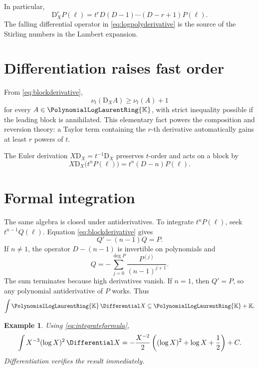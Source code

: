 \documentclass[11pt,oneside,openany]{book}
\newtheorem{example}[theorem]{Example}
\newcommand{\K}{\mathbb{K}}
\newcommand{\Pring}{\PolynomialLogLaurentRing{\K}}
\newcommand{\ordt}{\nu_t}
\newcommand{\D}{\mathrm{D}}
\begin{document}
In particular,
\begin{equation}\label{eq:logpolyderivative}
  \D_X^r P(\ell)
  =t^r D(D-1)\cdots(D-r+1)P(\ell).
\end{equation}
The falling differential operator in \cref{eq:logpolyderivative} is the source
of the Stirling numbers in the Lambert expansion.

\section{Differentiation raises fast order}
From \cref{eq:blockderivative},
\begin{equation}\label{eq:Dvaluation}
  \ordt(\D_XA)\geq\ordt(A)+1
\end{equation}
for every \(A\in\Pring\), with strict inequality possible if the leading block
is annihilated.  This elementary fact powers the composition and reversion
theory: a Taylor term containing the \(r\)-th derivative automatically gains at
least \(r\) powers of \(t\).

The Euler derivation \(X\D_X=t^{-1}\D_X\) preserves \(t\)-order and acts on a
block by
\begin{equation}\label{eq:Euler}
  X\D_X\bigl(t^nP(\ell)\bigr)
  =t^n(D-n)P(\ell).
\end{equation}

\section{Formal integration}
The same algebra is closed under antiderivatives.  To integrate
\(t^nP(\ell)\), seek \(t^{n-1}Q(\ell)\).  Equation
\cref{eq:blockderivative} gives
\begin{equation}\label{eq:integrateODE}
  Q'-(n-1)Q=P.
\end{equation}
If \(n\neq1\), the operator \(D-(n-1)\) is invertible on polynomials and
\begin{equation}\label{eq:integrateformula}
  Q=-\sum_{j=0}^{\deg P}\frac{P^{(j)}}{(n-1)^{j+1}}.
\end{equation}
The sum terminates because high derivatives vanish.  If \(n=1\), then
\(Q'=P\), so any polynomial antiderivative of \(P\) works.  Thus
\begin{equation}\label{eq:integrationclosed}
  \int \Pring\,\Differential X\subseteq\Pring+\K.
\end{equation}

\begin{example}
Using \cref{eq:integrateformula},
\[
 \int X^{-3}(\log X)^2\,\Differential X
 =-\frac{X^{-2}}{2}
   \left((\log X)^2+\log X+\frac12\right)+C.
\]
Differentiation verifies the result immediately.
\end{example}
\end{document}
